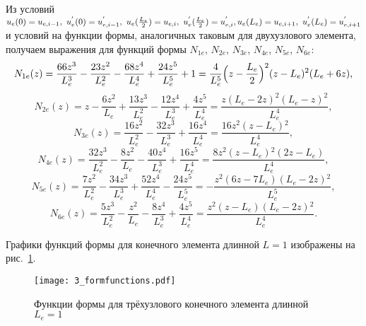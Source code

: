 \documentclass[12pt,a4paper]{article}
\begin{document}
	
Из условий $u_e(0)=u_{e, i-1},~ u_e^{'}(0)=u^{'}_{e, i-1},~ u_{e}(\frac{L_e}{2})=u_{e,i},~ u_{e}^{'}(\frac{L_e}{2})=u^{'}_{e,i},\\
 u_{e}(L_e)=u_{e,i+1},~ u_{e}^{'}(L_e)=u^{'}_{e,i+1}$ и
условий на функции формы, аналогичных таковым для двухузлового элемента,
получаем выражения для функций формы $N_{1e}$, $N_{2e}$, $N_{3e}$, $N_{4e}$, $N_{5e}$, $N_{6e}$:
$$N_{1e}(z)=\frac{66z^{3}}{L_e^{3}}-\frac{23z^{2}}{L_e^{2}}-\frac{68z^{4}}{L_e^{4}}+\frac{24z^{5}}{L_e^{5}}+1= \frac{4}{L_e^5}\Bigl( z-\frac{L_e}{2} \Bigr)^2(z-L_e)^2(L_e+6z),$$
$$N_{2e}(z)=z-\frac{6z^{2}}{L_e}+\frac{13z^{3}}{L_e^{2}}-\frac{12z^{4}}{L_e^{3}}+\frac{4z^{5}}{L_e^{4}}=\frac{z (L_e-2 z)^2 (L_e-z)^2}{L_e^4},$$
$$N_{3e}(z)=\frac{16z^{2}}{L_e^{2}}-\frac{32z^{3}}{L_e^{3}}+\frac{16z^{4}}{L_e^{4}}=\frac{16 z^2 \left(z-L_e\right){}^2}{L_e^4},$$
$$N_{4e}(z)=\frac{32z^{3}}{L_e^{2}}-\frac{8z^{2}}{L_e}-\frac{40z^{4}}{L_e^{3}}+\frac{16z^{5}}{L_e^{4}}=\frac{8 z^2 \left(z-L_e\right){}^2 \left(2 z-L_e\right)}{L_e^4},$$
$$N_{5e}(z)=\frac{7z^{2}}{L_e^{2}}-\frac{34z^{3}}{L_e^{3}}+\frac{52z^{4}}{L_e^{4}}-\frac{24z^{5}}{L_e^{5}}=-\frac{z^2 \left(6 z-7 L_e\right) \left(L_e-2 z\right){}^2}{L_e^5},$$
$$N_{6e}(z)=\frac{5z^{3}}{L_e^{2}}-\frac{z^{2}}{L_e}-\frac{8z^{4}}{L_e^{3}}+\frac{4z^{5}}{L_e^{4}}=\frac{z^2 \left(z-L_e\right) \left(L_e-2 z\right){}^2}{L_e^4}.$$  

Графики функций формы для конечного элемента длинной $L=1$ изображены на рис.~\ref{fig:3_formfunctions}.

\begin{figure}[H]
		\centering
		\texttt{[image: 3\_formfunctions.pdf]}
		\caption{Функции формы для трёхузлового конечного элемента длинной $L_{e}=1$}
		\label{fig:3_formfunctions}
	\end{figure}
\end{document}
